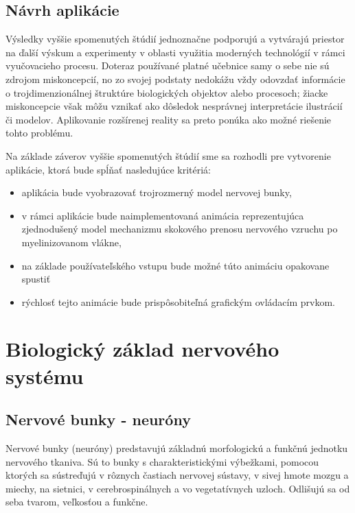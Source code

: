 \subsection{Návrh aplikácie}
Výsledky vyššie spomenutých štúdií jednoznačne podporujú a vytvárajú priestor na ďalší výskum a experimenty v oblasti využitia moderných technológií v rámci vyučovacieho procesu. Doteraz používané
platné učebnice samy o sebe nie sú zdrojom miskoncepcií, no zo svojej podstaty nedokážu vždy odovzdať informácie o trojdimenzionálnej štruktúre biologických objektov alebo procesoch; 
žiacke miskoncepcie však môžu vznikať ako dôsledok nesprávnej interpretácie ilustrácií či modelov. Aplikovanie rozšírenej reality sa preto ponúka ako možné riešenie tohto problému.

Na základe záverov vyššie spomenutých štúdií sme sa rozhodli pre vytvorenie aplikácie, ktorá bude spĺňať nasledujúce kritériá:
\begin{itemize}
  \item aplikácia bude vyobrazovať trojrozmerný model nervovej bunky,
  \item v rámci aplikácie bude naimplementovaná animácia reprezentujúca zjednodušený model mechanizmu skokového prenosu nervového vzruchu po myelinizovanom vlákne,
  \item na základe používateľského vstupu bude možné túto animáciu opakovane spustiť
  \item rýchlosť tejto animácie bude prispôsobiteľná grafickým ovládacím prvkom.
\end{itemize}

\section{Biologický základ nervového systému}
\subsection{Nervové bunky - neuróny}
Nervové bunky (neuróny) predstavujú základnú morfologickú a funkčnú jednotku nervového tkaniva. Sú to bunky s charakteristickými výbežkami, pomocou ktorých sa sústreďujú v rôznych častiach nervovej 
sústavy, v sivej hmote mozgu a miechy, na sietnici, v cerebrospinálnych a vo vegetatívnych uzloch. Odlišujú sa od seba tvarom, veľkosťou a funkčne. 

